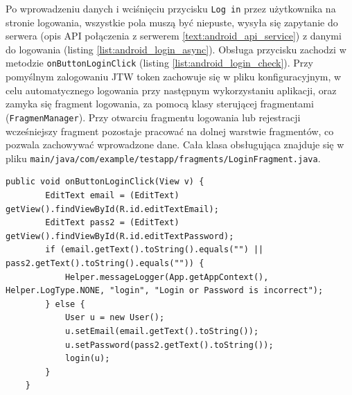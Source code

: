 Po \label{text:login} wprowadzeniu danych i wciśnięciu przycisku \texttt{Log in} przez użytkownika na stronie logowania, wszystkie pola muszą być niepuste, wysyła się zapytanie do serwera (opis API połączenia z serwerem \ref{text:android_api_service}) z danymi do logowania (listing \ref{list:android_login_async}). Obsługa przycisku zachodzi w metodzie \texttt{onButtonLoginClick} (listing \ref{list:android_login_check}).
Przy pomyślnym zalogowaniu JTW token zachowuje się w pliku konfiguracyjnym, w celu automatycznego logowania przy następnym wykorzystaniu aplikacji, oraz zamyka się fragment logowania, za pomocą klasy sterującej fragmentami (\texttt{FragmenManager}). Przy otwarciu fragmentu logowania lub rejestracji wcześniejszy fragment pozostaje pracować na dolnej warstwie fragmentów, co pozwala zachowywać wprowadzone dane.
Cała klasa obsługująca znajduje się w pliku \texttt{main/java/com/example/testapp/fragments/LoginFragment.java}.
\begin{lstlisting}[label=list:android_login_check,caption=Obsługa przycisku login.,basicstyle=\tiny\ttfamily]
    public void onButtonLoginClick(View v) {
        EditText email = (EditText) getView().findViewById(R.id.editTextEmail);
        EditText pass2 = (EditText) getView().findViewById(R.id.editTextPassword);
        if (email.getText().toString().equals("") || pass2.getText().toString().equals("")) {
            Helper.messageLogger(App.getAppContext(), Helper.LogType.NONE, "login", "Login or Password is incorrect");
        } else {
            User u = new User();
            u.setEmail(email.getText().toString());
            u.setPassword(pass2.getText().toString());
            login(u);
        }
    }
\end{lstlisting}

